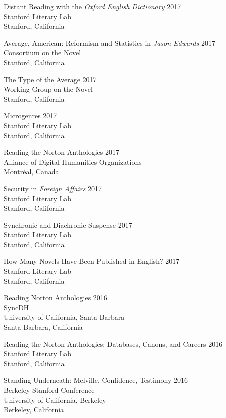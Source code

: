 \documentclass[
  12pt,
  letterpaper,
]{article}
\begin{document}
Distant Reading with the \emph{Oxford English Dictionary} \hfill 2017\\
Stanford Literary Lab\\
Stanford, California

Average, American: Reformism and Statistics in \emph{Jason Edwards}
\hfill 2017\\
Consortium on the Novel\\
Stanford, California

The Type of the Average \hfill 2017\\
Working Group on the Novel\\
Stanford, California

Microgenres \hfill 2017\\
Stanford Literary Lab\\
Stanford, California

Reading the Norton Anthologies \hfill 2017\\
Alliance of Digital Humanities Organizations\\
Montréal, Canada

Security in \emph{Foreign Affairs} \hfill 2017\\
Stanford Literary Lab\\
Stanford, California

Synchronic and Diachronic Suspense \hfill 2017\\
Stanford Literary Lab\\
Stanford, California

How Many Novels Have Been Published in English? \hfill 2017\\
Stanford Literary Lab\\
Stanford, California

Reading Norton Anthologies \hfill 2016\\
SyncDH\\
University of California, Santa Barbara\\
Santa Barbara, California

Reading the Norton Anthologies: Databases, Canons, and Careers \hfill 2016\\
Stanford Literary Lab\\
Stanford, California

Standing Underneath: Melville, Confidence, Testimony \hfill 2016\\
Berkeley-Stanford Conference\\
University of California, Berkeley\\
Berkeley, California
\end{document}
